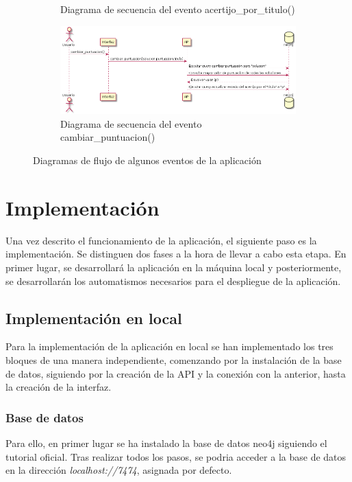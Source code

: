 \begin{figure}[hbtp]
\begin{subfigure}{.6\textwidth}
    \caption{Diagrama de secuencia del evento acertijo\_por\_titulo()} 
    \label{fig::acertijoportitulo}
\end{subfigure}
\begin{subfigure}{.6\textwidth}
     \centerline{\includegraphics[width=11cm]{figuras/cambiar_puntuacion.png}}
    \caption{Diagrama de secuencia del evento cambiar\_puntuacion()} 
    \label{fig::cambiarpuntuacion}
\end{subfigure}
\caption{Diagramas de flujo de algunos eventos de la aplicación }
\label{fig::secuencia}
\end{figure}


\section{Implementación}

Una vez descrito el funcionamiento de la aplicación, el siguiente paso es la implementación. Se distinguen dos fases a la hora de llevar a cabo esta etapa. En primer lugar, se desarrollará la aplicación en la máquina local y  posteriormente, se desarrollarán los automatismos necesarios para el despliegue de la aplicación.

\subsection{Implementación en local}

Para la implementación de la aplicación en local se han implementado los tres bloques de una manera independiente, comenzando por la instalación de la base de datos, siguiendo por la creación de la API y la conexión con la anterior, hasta la creación de la interfaz.

\subsubsection{Base de datos}

Para ello, en primer lugar se ha instalado la base de datos neo4j siguiendo el tutorial oficial. Tras realizar todos los pasos, se podria acceder a la base de datos en la dirección\textit{ localhost://7474}, asignada por defecto\cite{neo4jinstall}.

